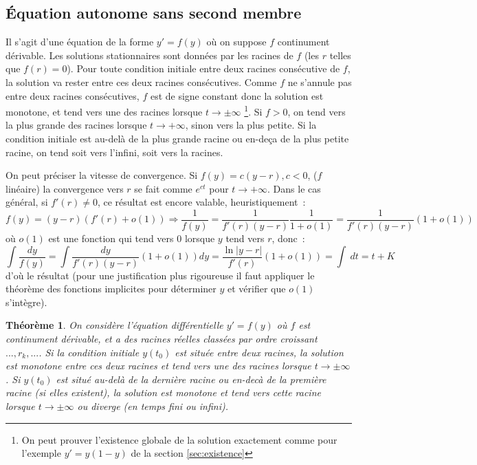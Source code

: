 \documentclass[a4paper,11pt]{book}
\newtheorem{thm}{Théorème}
\begin{document}
\begin{giacjshere}
\subsection{\'Equation autonome sans second membre}
Il s'agit d'une \'equation de la forme $y'=f(y)$ o\`u on
suppose $f$ continument d\'erivable. Les solutions
stationnaires sont donn\'ees par les racines de $f$ (les
$r$ telles que $f(r)=0$). Pour toute condition initiale entre
deux racines cons\'ecutive de $f$, la solution va rester entre
ces deux racines cons\'ecutives. Comme $f$ ne s'annule pas
entre deux racines cons\'ecutives, $f$ est de signe constant
donc la solution est monotone,
et tend vers une des racines lorsque $t \rightarrow \pm \infty$
\footnote{On peut prouver l'existence globale de la solution
exactement comme pour l'exemple $y'=y(1-y)$ de la section 
\ref{sec:existence}}.
Si $f>0$, on tend vers la plus grande des racines lorsque $t
\rightarrow +\infty$, sinon vers la plus petite. Si la condition 
initiale est au-del\`a de la plus grande racine ou en-de\c{c}a
de la plus petite racine, on tend soit vers l'infini, soit vers la racines.

On peut pr\'eciser
la vitesse de convergence. Si $f(y)=c(y-r), c<0$, ($f$ lin\'eaire)
la convergence vers $r$ se fait comme $e^{ct}$ pour $t \rightarrow
+\infty$. Dans le cas
g\'en\'eral, si $f'(r) \neq 0$, 
ce r\'esultat est encore valable, heuristiquement~:
$$ f(y)=(y-r)(f'(r)+o(1)) \Rightarrow \frac{1}{f(y)}=
\frac{1}{f'(r)(y-r)} \frac{1}{1+o(1)}
=\frac{1}{f'(r)(y-r)}(1 + o(1))$$
o\`u $o(1)$ est une fonction qui tend vers 0 lorsque $y$ tend vers
$r$, donc~:
$$ \int \frac{dy}{f(y)} = \int \frac{dy}{f'(r)(y-r)}(1 + o(1)) dy 
= \frac{\ln|y-r|}{f'(r)} (1 + o(1)) = \int \ dt = t+K  $$
d'o\`u le r\'esultat (pour une justification plus rigoureuse
il faut appliquer le th\'eor\`eme des fonctions implicites
pour d\'eterminer $y$ et v\'erifier que $o(1)$ s'int\`egre).

\begin{thm}
On consid\`ere l'\'equation diff\'erentielle $y'=f(y)$ o\`u
$f$ est continument d\'erivable, et a des racines r\'eelles
class\'ees par ordre croissant $...,r_k,...$. Si la condition
initiale $y(t_0)$ est
situ\'ee entre deux racines, la solution est monotone entre
ces deux racines et tend vers une des racines lorsque $t\rightarrow
\pm \infty$. Si $y(t_0)$ est situ\'e au-del\`a de la derni\`ere racine
ou en-dec\`a de la premi\`ere racine (si elles existent), 
la solution est monotone et
tend vers cette racine lorsque $t\rightarrow \pm \infty$
ou diverge (en temps fini ou infini).


\end{thm}
\end{giacjshere}
\end{document}
